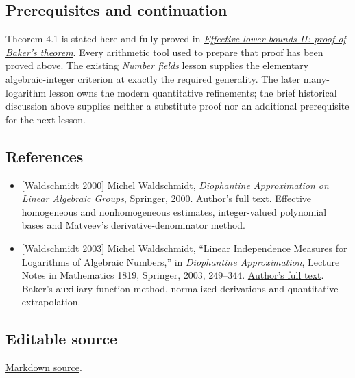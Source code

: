 \documentclass[
  11pt,
  a4paper,
]{article}
\providecommand{\tightlist}{%
  \setlength{\itemsep}{0pt}\setlength{\parskip}{0pt}}
\begin{document}
\subsection{Prerequisites and
continuation}\label{prerequisites-and-continuation}

Theorem 4.1 is stated here and fully proved in
\href{https://kokunoyumeto.github.io/open-math-courses-public/courses/TR-BAKER/TR-BAKER-05.html}{\emph{Effective lower bounds II: proof of
Baker's theorem}}. Every arithmetic tool used to prepare that proof has
been proved above. The existing \emph{Number fields} lesson supplies the
elementary algebraic-integer criterion at exactly the required
generality. The later many-logarithm lesson owns the modern quantitative
refinements; the brief historical discussion above supplies neither a
substitute proof nor an additional prerequisite for the next lesson.

\subsection{References}\label{references}

\begin{itemize}
\tightlist
\item
  {[}Waldschmidt 2000{]} Michel Waldschmidt, \emph{Diophantine
  Approximation on Linear Algebraic Groups}, Springer, 2000.
  \href{https://webusers.imj-prg.fr/~michel.waldschmidt/articles/pdf/dalag.pdf}{Author's
  full text}. Effective homogeneous and nonhomogeneous estimates,
  integer-valued polynomial bases and Matveev's derivative-denominator
  method.
\item
  {[}Waldschmidt 2003{]} Michel Waldschmidt, ``Linear Independence
  Measures for Logarithms of Algebraic Numbers,'' in \emph{Diophantine
  Approximation}, Lecture Notes in Mathematics 1819, Springer, 2003,
  249--344.
  \href{https://webusers.imj-prg.fr/~michel.waldschmidt/articles/pdf/SpringerLN1819-2003.pdf}{Author's
  full text}. Baker's auxiliary-function method, normalized derivations
  and quantitative extrapolation.
\end{itemize}

\subsection{Editable source}\label{editable-source}

\href{https://kokunoyumeto.github.io/open-math-courses-public/courses/TR-BAKER/src/TR-BAKER-04.md}{Markdown source}.
\end{document}

